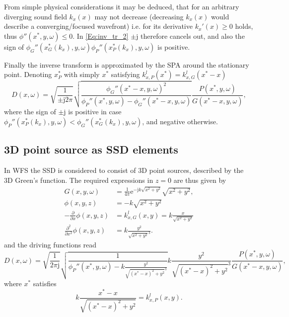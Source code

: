 \documentclass[12pt,a4paper]{article}
\newcommand{\te}{\mathrm{e}}
\newcommand{\ti}{\mathrm{j}}
\begin{document}
From simple physical considerations it may be deduced, that for an arbitrary diverging sound field $k_x(x)$ may not decrease (decreasing $k_x(x)$ would describe a converging/focused wavefront) i.e. for its derivative $k_x'(x) \geq 0$ holds, thus $\phi''(x^*,y,\omega)\leq 0$.
In \eqref{Eq:inv_tr_2} $\pm \ti$ therefore cancels out, and also the sign of $\phi_G''(x_G^*(k_x),y,\omega) \phi_P''(x_P^*(k_x),y,\omega)$ is positive. 

Finally the inverse transform is approximated by the SPA around the stationary point. Denoting $x_P^*$ with simply $x^*$ satisfying $k_{x,P}^l(x^*) = k_{x,G}^l(x^*-x)$
\begin{equation}
D(x,\omega) = 
\sqrt{\frac{1}{\pm \ti2\pi}}
\sqrt{\frac{\phi_G''(x^*- x,y,\omega)^2}{\phi_P''(x^*,y,\omega) - \phi_G''(x^*- x,y,\omega)}}
\frac{ P(x^*,y,\omega) }{G(x^*- x,y,\omega) },
\end{equation}
where the sign of $\pm \ti$ is positive in case $\phi_P''(x_P^*(k_x),y,\omega) < \phi_G''(x_G^*(k_x),y,\omega)$, and negative otherwise.

\subsection{3D point source as SSD elements}
In WFS the SSD is considered to consist of 3D point sources, described by the 3D Green's function. The required expressions in $z=0$ are thus given by
\begin{align}
G(x,y,\omega)  &= \frac{1}{4\pi}\te^{-\ti k \sqrt{x^2+y^2}}{\sqrt{x^2 + y^2}},\\
\phi(x,y,z)    &= -k \sqrt{x^2+y^2} \\
-\frac{\partial}{\partial x} \phi(x,y,z)     &= k_{x,G}^l(x,y) = k \frac{x}{\sqrt{x^2+y^2}}\\
\frac{\partial^2}{\partial x^2} \phi(x,y,z) &= k\frac{y^2}{\sqrt{x^2+y^2}^3} .
\end{align}
and the driving functions read
\begin{equation}
D(x,\omega) = 
\sqrt{\frac{1}{2\pi \ti}}
\sqrt{\frac{1}{\phi_P''(x^*,y,\omega) - k\frac{y^2}{\sqrt{(x^*-x)^2+y^2}^3}}}
k\frac{y^2}{\sqrt{(x^*-x)^2+y^2}^3}
\frac{ P(x^*,y,\omega) }{G(x^*- x,y,\omega) },
\end{equation}
where $x^*$ satisfies
\begin{equation}
 k \frac{x^*-x}{\sqrt{(x^*-x)^2+y^2}} = k_{x,P}^l(x,y).
\end{equation}
\end{document}
